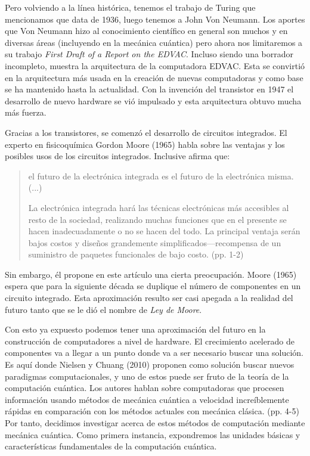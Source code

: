 \documentclass[11pt,a4paper]{article}
\begin{document}
Pero volviendo a la línea histórica, tenemos el trabajo de Turing que mencionamos que data de 1936, luego tenemos a John Von Neumann. Los aportes que Von Neumann hizo al conocimiento científico en general son muchos y en diversas áreas (incluyendo en la mecánica cuántica) pero ahora nos limitaremos a su trabajo \textit{First Draft of a Report on the EDVAC}. Incluso siendo una borrador incompleto, muestra la arquitectura de la computadora EDVAC. Esta se convirtió en la arquitectura más usada en la creación de nuevas computadoras y como base se ha mantenido hasta la actualidad. Con la invención del transistor en 1947 el desarrollo de nuevo hardware se vió impulsado y esta arquitectura obtuvo mucha más fuerza.

Gracias a los transistores, se comenzó el desarrollo de circuitos integrados. El experto en fisicoquímica Gordon Moore (1965) habla sobre las ventajas y los posibles usos de los circuitos integrados. Inclusive afirma que: 
\begin{quote}
el futuro de la electrónica integrada es el futuro de la electrónica misma.(...)

La electrónica integrada hará las técnicas electrónicas más accesibles al resto de la sociedad, realizando muchas funciones que en el presente se hacen inadecuadamente o no se hacen del todo. La principal ventaja serán bajos costos y diseños grandemente simplificados---recompensa de un suministro de paquetes funcionales de bajo costo. (pp. 1-2)
\end{quote}
Sin embargo, él propone en este artículo una cierta preocupación. Moore (1965) espera que para la siguiente década se duplique el número de componentes en un circuito integrado. Esta aproximación resulto ser casi apegada a la realidad del futuro tanto que se le dió el nombre de \textit{Ley de Moore}.

Con esto ya expuesto podemos tener una aproximación del futuro en la construcción de computadores a nivel de hardware. El crecimiento acelerado de componentes va a llegar a un punto donde va a ser necesario buscar una solución. Es aquí donde Nielsen y Chuang (2010) proponen como solución buscar nuevos paradigmas computacionales, y uno de estos puede ser fruto de la teoría de la computación cuántica. Los autores hablan sobre computadoras que procesen información usando métodos de mecánica cuántica a velocidad increíblemente rápidas en comparación con los métodos actuales con mecánica clásica. (pp. 4-5) Por tanto, decidimos investigar acerca de estos métodos de computación mediante mecánica cuántica. Como primera instancia, expondremos las unidades básicas y características fundamentales de la computación cuántica.
\clearpage
\end{document}
